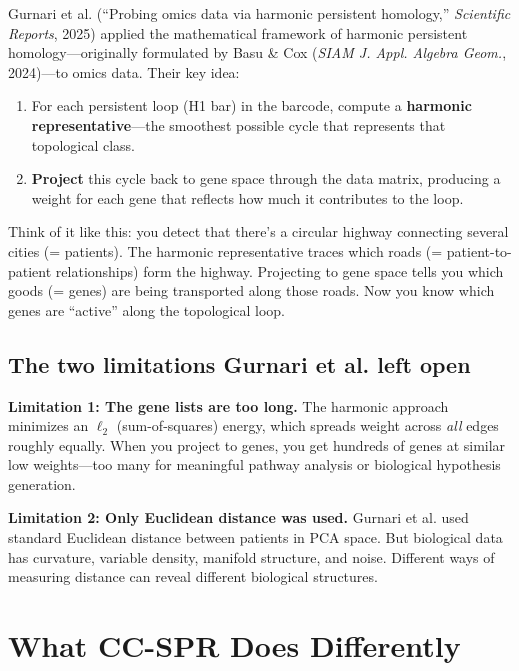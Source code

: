 \documentclass[11pt]{article}
\begin{document}
Gurnari et al. (``Probing omics data via harmonic persistent homology,'' \emph{Scientific Reports}, 2025) applied the mathematical framework of harmonic persistent homology---originally formulated by Basu \& Cox (\emph{SIAM J. Appl. Algebra Geom.}, 2024)---to omics data. Their key idea:

\begin{enumerate}
    \item For each persistent loop (H1 bar) in the barcode, compute a \textbf{harmonic representative}---the smoothest possible cycle that represents that topological class.
    \item \textbf{Project} this cycle back to gene space through the data matrix, producing a weight for each gene that reflects how much it contributes to the loop.
\end{enumerate}

\begin{analogy}
Think of it like this: you detect that there's a circular highway connecting several cities (= patients). The harmonic representative traces which roads (= patient-to-patient relationships) form the highway. Projecting to gene space tells you which goods (= genes) are being transported along those roads. Now you know which genes are ``active'' along the topological loop.
\end{analogy}

\subsection{The two limitations Gurnari et al. left open}

\textbf{Limitation 1: The gene lists are too long.} The harmonic approach minimizes an $\ell_2$ (sum-of-squares) energy, which spreads weight across \emph{all} edges roughly equally. When you project to genes, you get hundreds of genes at similar low weights---too many for meaningful pathway analysis or biological hypothesis generation.

\textbf{Limitation 2: Only Euclidean distance was used.} Gurnari et al. used standard Euclidean distance between patients in PCA space. But biological data has curvature, variable density, manifold structure, and noise. Different ways of measuring distance can reveal different biological structures.

\section{What CC-SPR Does Differently}
\label{sec:ccspr}
\end{document}
